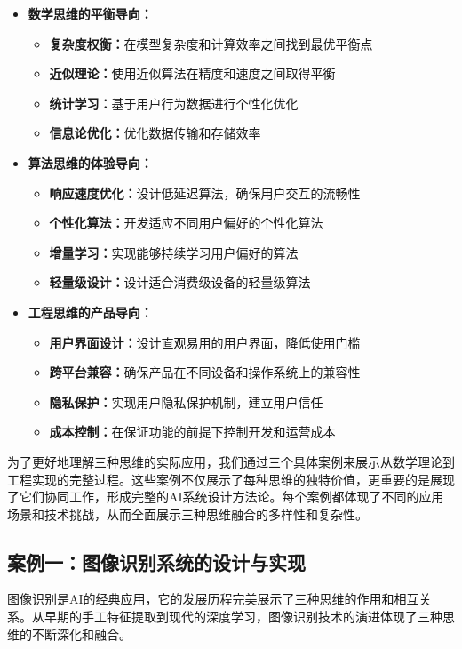 \begin{itemize}
\item \textbf{数学思维的平衡导向：}
\begin{itemize}
\item \textbf{复杂度权衡：}在模型复杂度和计算效率之间找到最优平衡点
\item \textbf{近似理论：}使用近似算法在精度和速度之间取得平衡
\item \textbf{统计学习：}基于用户行为数据进行个性化优化
\item \textbf{信息论优化：}优化数据传输和存储效率
\end{itemize}

\item \textbf{算法思维的体验导向：}
\begin{itemize}
\item \textbf{响应速度优化：}设计低延迟算法，确保用户交互的流畅性
\item \textbf{个性化算法：}开发适应不同用户偏好的个性化算法
\item \textbf{增量学习：}实现能够持续学习用户偏好的算法
\item \textbf{轻量级设计：}设计适合消费级设备的轻量级算法
\end{itemize}

\item \textbf{工程思维的产品导向：}
\begin{itemize}
\item \textbf{用户界面设计：}设计直观易用的用户界面，降低使用门槛
\item \textbf{跨平台兼容：}确保产品在不同设备和操作系统上的兼容性
\item \textbf{隐私保护：}实现用户隐私保护机制，建立用户信任
\item \textbf{成本控制：}在保证功能的前提下控制开发和运营成本
\end{itemize}
\end{itemize}


为了更好地理解三种思维的实际应用，我们通过三个具体案例来展示从数学理论到工程实现的完整过程。这些案例不仅展示了每种思维的独特价值，更重要的是展现了它们协同工作，形成完整的AI系统设计方法论。每个案例都体现了不同的应用场景和技术挑战，从而全面展示三种思维融合的多样性和复杂性。

\subsection{案例一：图像识别系统的设计与实现}

图像识别是AI的经典应用，它的发展历程完美展示了三种思维的作用和相互关系。从早期的手工特征提取到现代的深度学习，图像识别技术的演进体现了三种思维的不断深化和融合。

